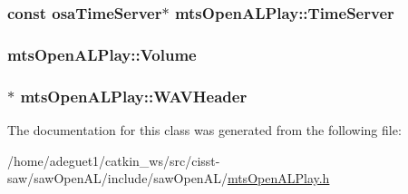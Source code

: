 \hypertarget{classmts_open_a_l_play_ae7df403a9ca556114dcc51164ac96fb4}{
\subsubsection[{Time\-Server}]{\setlength{\rightskip}{0pt plus 5cm}const {\bf osa\-Time\-Server}$\ast$ mts\-Open\-A\-L\-Play\-::\-Time\-Server\hspace{0.3cm}{\ttfamily [protected]}}}\label{classmts_open_a_l_play_ae7df403a9ca556114dcc51164ac96fb4}
\hypertarget{classmts_open_a_l_play_aaebfc63c5f4cc5d7b6ce8cd803ddfef2}{
\subsubsection[{Volume}]{ mts\-Open\-A\-L\-Play\-::\-Volume\hspace{0.3cm}{\ttfamily [protected]}}}\label{classmts_open_a_l_play_aaebfc63c5f4cc5d7b6ce8cd803ddfef2}
\hypertarget{classmts_open_a_l_play_afd9605c7b660000eb488149bca497bff}{
\subsubsection[{W\-A\-V\-Header}]{$\ast$ mts\-Open\-A\-L\-Play\-::\-W\-A\-V\-Header\hspace{0.3cm}{\ttfamily [protected]}}}\label{classmts_open_a_l_play_afd9605c7b660000eb488149bca497bff}


The documentation for this class was generated from the following file\-:\begin{DoxyCompactItemize}
\item 
/home/adeguet1/catkin\-\_\-ws/src/cisst-\/saw/saw\-Open\-A\-L/include/saw\-Open\-A\-L/\hyperlink{mts_open_a_l_play_8h}{mts\-Open\-A\-L\-Play.\-h}\end{DoxyCompactItemize}
